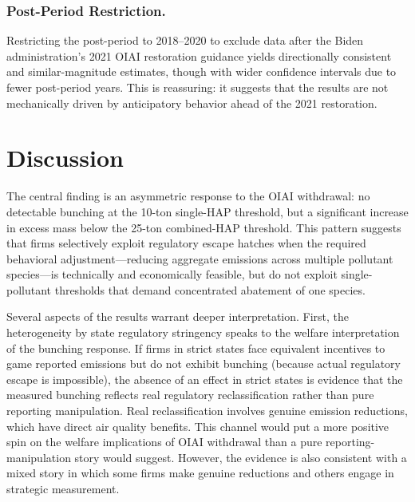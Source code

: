 \documentclass[12pt]{article}
\begin{document}
\subsubsection*{Post-Period Restriction.}
Restricting the post-period to 2018--2020 to exclude data after the Biden administration's 2021 OIAI restoration guidance yields directionally consistent and similar-magnitude estimates, though with wider confidence intervals due to fewer post-period years. This is reassuring: it suggests that the results are not mechanically driven by anticipatory behavior ahead of the 2021 restoration.

\section{Discussion}

The central finding is an asymmetric response to the OIAI withdrawal: no detectable bunching at the 10-ton single-HAP threshold, but a significant increase in excess mass below the 25-ton combined-HAP threshold. This pattern suggests that firms selectively exploit regulatory escape hatches when the required behavioral adjustment---reducing aggregate emissions across multiple pollutant species---is technically and economically feasible, but do not exploit single-pollutant thresholds that demand concentrated abatement of one species.

Several aspects of the results warrant deeper interpretation. First, the heterogeneity by state regulatory stringency speaks to the welfare interpretation of the bunching response. If firms in strict states face equivalent incentives to game reported emissions but do not exhibit bunching (because actual regulatory escape is impossible), the absence of an effect in strict states is evidence that the measured bunching reflects real regulatory reclassification rather than pure reporting manipulation. Real reclassification involves genuine emission reductions, which have direct air quality benefits. This channel would put a more positive spin on the welfare implications of OIAI withdrawal than a pure reporting-manipulation story would suggest. However, the evidence is also consistent with a mixed story in which some firms make genuine reductions and others engage in strategic measurement.
\end{document}
